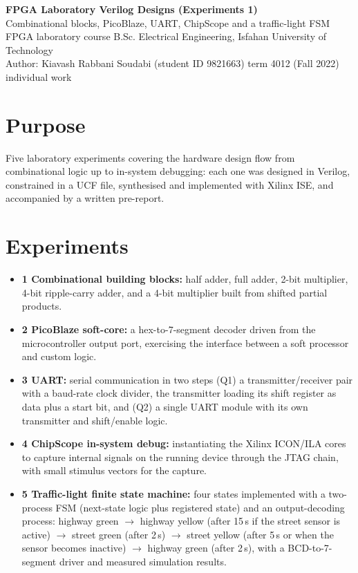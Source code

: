 \documentclass[10pt,a4paper]{article}
\begin{document}
\begin{center}
{\Large\bfseries FPGA Laboratory \textendash{} Verilog Designs (Experiments 1)}\\[2pt]
{\large Combinational blocks, PicoBlaze, UART, ChipScope and a traffic-light FSM}\\[4pt]
{\small FPGA laboratory course \textendash{} B.Sc. Electrical Engineering, Isfahan University of Technology}\\
{\small Author: Kiavash Rabbani Soudabi (student ID 9821663) \textendash{} term 4012 (Fall 2022) \textendash{} individual work}
\end{center}

\section*{Purpose}
Five laboratory experiments covering the hardware design flow from combinational logic up to in-system debugging:
each one was designed in Verilog, constrained in a UCF file, synthesised and implemented with Xilinx ISE, and
accompanied by a written pre-report.

\section*{Experiments}
\begin{itemize}
  \item \textbf{1 \textendash{} Combinational building blocks:} half adder, full adder, 2-bit multiplier, 4-bit
        ripple-carry adder, and a 4-bit multiplier built from shifted partial products.
  \item \textbf{2 \textendash{} PicoBlaze soft-core:} a hex-to-7-segment decoder driven from the microcontroller
        output port, exercising the interface between a soft processor and custom logic.
  \item \textbf{3 \textendash{} UART:} serial communication in two steps \textendash{} (Q1) a transmitter/receiver
        pair with a baud-rate clock divider, the transmitter loading its shift register as data plus a start bit, and
        (Q2) a single UART module with its own transmitter and shift/enable logic.
  \item \textbf{4 \textendash{} ChipScope in-system debug:} instantiating the Xilinx ICON/ILA cores to capture
        internal signals on the running device through the JTAG chain, with small stimulus vectors for the capture.
  \item \textbf{5 \textendash{} Traffic-light finite state machine:} four states implemented with a two-process FSM
        (next-state logic plus registered state) and an output-decoding process: highway green $\rightarrow$ highway
        yellow (after 15\,s if the street sensor is active) $\rightarrow$ street green (after 2\,s) $\rightarrow$
        street yellow (after 5\,s or when the sensor becomes inactive) $\rightarrow$ highway green (after 2\,s), with a
        BCD-to-7-segment driver and measured simulation results.
\end{itemize}
\end{document}
